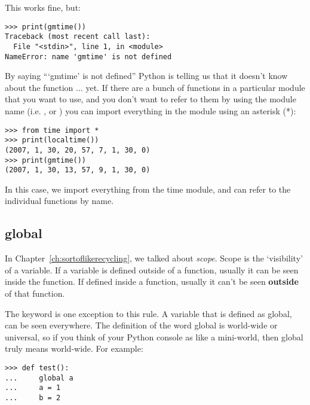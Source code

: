 \noindent
This works fine, but:

\begin{Verbatim}[frame=single]
>>> print(gmtime())
Traceback (most recent call last):
  File "<stdin>", line 1, in <module>
NameError: name 'gmtime' is not defined
\end{Verbatim}

By saying ```gmtime' is not defined'' Python is telling us that it doesn't know about the function $\ldots$ yet. If there are a bunch of functions in a particular module that you want to use, and you don't want to refer to them by using the module name (i.e. , or ) you can import everything in the module using an asterisk (*):

\begin{Verbatim}[frame=single]
>>> from time import *
>>> print(localtime())
(2007, 1, 30, 20, 57, 7, 1, 30, 0)
>>> print(gmtime())
(2007, 1, 30, 13, 57, 9, 1, 30, 0)
\end{Verbatim}

In this case, we import everything from the time module, and can refer to the individual functions by name.

\subsection*{global}

In Chapter~\ref{ch:sortoflikerecycling}, we talked about \emph{scope}.  Scope is the `visibility' of a variable. If a variable is defined outside of a function, usually it can be seen inside the function. If defined inside a function, usually it can't be seen \textbf{outside} of that function.
\par
The  keyword is one exception to this rule. A variable that is defined as global, can be seen everywhere. The definition of the word global is world-wide or universal, so if you think of your Python console as like a mini-world, then global truly means world-wide.  For example:

\begin{Verbatim}[frame=single]
>>> def test():
...     global a
...     a = 1
...     b = 2
\end{Verbatim}

